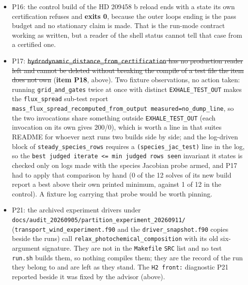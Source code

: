 \documentclass[english,a4paper]{my_memo}
\begin{document}
\begin{itemize}
  them (\texttt{grep} over \texttt{src/}), so the quadruple-precision rows\textquotesingle{} measured cost, which the module
  header calls a measured number and not an estimate, reaches no run summary;
  relatedly, nothing in \texttt{run.log} says whether \texttt{EXHALE\_RESID\_QUAD} took
  effect, so P15 had to establish that its quad run was a quad run indirectly,
  from the iteration-1 measure moving between the two binaries and from the
  sweep-kind reset READ in \texttt{steady\_newton.f90}. A line in the setup report, or
  those two counters reaching it, would make a quad run self-documenting. And
  the continuation refusal the item added has no executed row: it ends in
  \texttt{error\ stop}, which cannot be asserted from inside the driver process, and
  no production path reaches it, the key being default off and the
  continuation controller disarming before the JFNK finish (READ).
\item
  P16: the control build of the HD 209458 b reload ends with a state its own
  certification refuses and \textbf{exits 0}, because the outer loop\textquotesingle s ending is
  the pass budget and no stationary claim is made. That is the run-mode
  contract working as written, but a reader of the shell status cannot tell
  that case from a certified one.
\item
  P17: \st{\mbox{\texttt{hydrodynamic\_distance\_from\_certification}} has no production reader
  left and cannot be deleted without breaking the compile of a test file the
  item does not own} (\textbf{item P18}, above). Two fixture observations, no
  action taken: running \texttt{grid\_and\_gates} twice at once with distinct
  \texttt{EXHALE\_TEST\_OUT} makes the \texttt{flux\_spread} sub-test report
  \texttt{mass\_flux\_spread\_recomputed\_from\_output\ measured=no\_dump\_line}, so the two
  invocations share something outside \texttt{EXHALE\_TEST\_OUT} (each invocation on its own
  gives 200/0), which is worth a line in that suite\textquotesingle s README for whoever next
  runs two builds side by side; and the log-driven block of
  \texttt{steady\_species\_rows} requires a \texttt{(species\_jac\_test)} line in the log, so
  the \texttt{best\ judged\ iterate\ \textless{}=\ min\ judged\ rows\ seen} invariant it states is
  checked only on logs made with the species Jacobian probe armed, and P17 had
  to apply that comparison by hand (0 of the 12 solves of its new build report a
  best above their own printed minimum, against 1 of 12 in the control). A
  fixture log carrying that probe would be worth pinning.
\item
  P21: the archived experiment drivers under
  \texttt{docs/audit\_20260905/partition\_experiment\_20260911/}
  (\texttt{transport\_wind\_experiment.f90} and the \texttt{driver\_snapshot.f90} copies beside
  the runs) call \texttt{relax\_photochemical\_composition} with its old six-argument
  signature. They are not in the \texttt{Makefile} \texttt{SRC} list and no test \texttt{run.sh}
  builds them, so nothing compiles them; they are the record of the run they
  belong to and are left as they stand. The \texttt{H2\ front:} diagnostic P21 reported
  beside it was fixed by the advisor (above).
\end{itemize}
\end{document}
